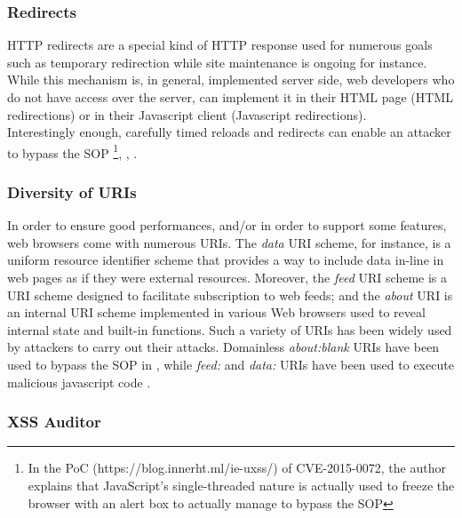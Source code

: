\documentclass[journal]{IEEEtran}
\begin{document}
\medskip

\subsubsection*{\textbf{Redirects}}

HTTP redirects are a special kind of HTTP response used for numerous goals such as temporary redirection while site maintenance is ongoing for instance. While this mechanism is, in general, implemented server side, web developers who do not have access over the server, can implement it in their HTML page (HTML redirections) or in their Javascript client (Javascript redirections). \\
Interestingly enough, carefully timed reloads and redirects can enable an attacker to bypass the SOP \cite{CVE-2015-0072}\footnote{In the PoC (https://blog.innerht.ml/ie-uxss/) of CVE-2015-0072, the author explains that JavaScript's single-threaded nature is actually used to freeze the browser with an alert box to actually manage to bypass the SOP}, \cite{CVE-2010-4045}, \cite{CVE-2009-3013}.

\medskip

\subsubsection*{\textbf{Diversity of URIs}}

In order to ensure good performances, and/or in order to support some features, web browsers come with numerous URIs. The \emph{data} URI scheme, for instance, is a uniform resource identifier scheme that provides a way to include data in-line in web pages as if they were external resources. Moreover, the \emph{feed} URI scheme is a URI scheme designed to facilitate subscription to web feeds; and the \emph{about} URI is an internal URI scheme implemented in various Web browsers used to reveal internal state and built-in functions. Such a variety of URIs has been widely used by attackers to carry out their attacks. Domainless \emph{about:blank} URIs have been used to bypass the SOP in \cite{domainlessAboutBlank}, while \emph{feed:} and \emph{data:} URIs have been used to execute malicious javascript code \cite{CVE-2012-1966} \cite{CVE-2012-1965} \cite{CVE-2011-2609} \cite{CVE-2012-6463} \cite{CVE-2010-2665}.

\medskip

\subsubsection*{\textbf{XSS Auditor}}
\end{document}
